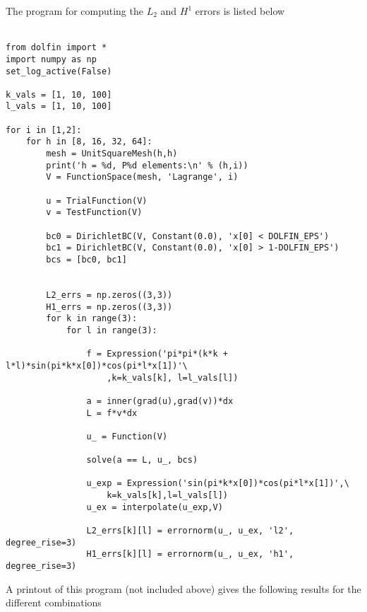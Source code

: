 \documentclass[a4paper,english,12pt,twoside]{article}
\begin{document}
The program for computing the $L_2$ and $H^1$ errors is listed below\\
\\
\begin{lstlisting}[style=python, basicstyle = \tiny]
from dolfin import *
import numpy as np
set_log_active(False)

k_vals = [1, 10, 100]
l_vals = [1, 10, 100]

for i in [1,2]:
	for h in [8, 16, 32, 64]:
		mesh = UnitSquareMesh(h,h)
		print('h = %d, P%d elements:\n' % (h,i))
		V = FunctionSpace(mesh, 'Lagrange', i)

		u = TrialFunction(V)
		v = TestFunction(V)

		bc0 = DirichletBC(V, Constant(0.0), 'x[0] < DOLFIN_EPS')
		bc1 = DirichletBC(V, Constant(0.0), 'x[0] > 1-DOLFIN_EPS')
		bcs = [bc0, bc1]


		L2_errs = np.zeros((3,3))
		H1_errs = np.zeros((3,3))
		for k in range(3):
			for l in range(3):

				f = Expression('pi*pi*(k*k + l*l)*sin(pi*k*x[0])*cos(pi*l*x[1])'\
					,k=k_vals[k], l=l_vals[l])

				a = inner(grad(u),grad(v))*dx
				L = f*v*dx

				u_ = Function(V)

				solve(a == L, u_, bcs)

				u_exp = Expression('sin(pi*k*x[0])*cos(pi*l*x[1])',\
					k=k_vals[k],l=l_vals[l])
				u_ex = interpolate(u_exp,V)

				L2_errs[k][l] = errornorm(u_, u_ex, 'l2', degree_rise=3)
				H1_errs[k][l] = errornorm(u_, u_ex, 'h1', degree_rise=3)
\end{lstlisting}
\newpage
A printout of this program (not included above) gives the following results for the different combinations\\
\end{document}
